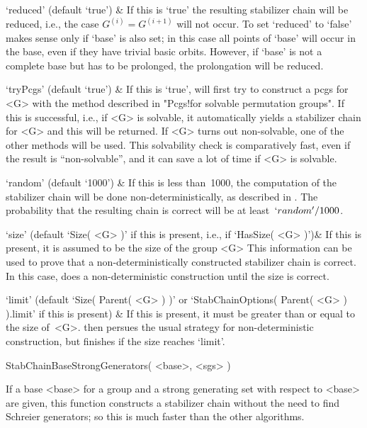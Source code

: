 `reduced' (default `true') &
        If this  is `true' the  resulting
        stabilizer chain   will  be reduced, i.e.,   the case  $G^{(i)} =
        G^{(i+1)}$  will  not occur. To set   `reduced'  to `false' makes
        sense only  if  `base' is also  set;  in this case  all points of
        `base' will occur  in the base,  even if they have  trivial basic
        orbits. However, if `base' is  not a complete base  but has to be
        prolonged, the prolongation will be reduced.

`tryPcgs' (default `true') &
        If this is `true', {\GAP} will first try to  construct a pcgs for
        <G> with  the method described  in "Pcgs!for solvable permutation
        groups".  If this is  successful, i.e.,  if  <G> is  solvable, it
        automatically yields a stabilizer chain for <G>  and this will be
        returned. If <G> turns out non-solvable, one of the other methods
        will be used. This solvability  check is comparatively fast, even
        if the result is ``non-solvable'', and it  can save a lot of time
        if <G> is solvable.

`random' (default `1000') &
        If this  is  less than~1000,  the  computation of the  stabilizer
        chain  will  be   done  non-deterministically, as  described   in
        \cite{Seress97}. The  probability  that the  resulting  chain  is
        correct will be at least~$`random'/1000$.

`size' (default `Size( <G> )' if this is present, i.e., if `HasSize( <G>
)')&
        If this is present, it is assumed to be the size of the group <G>
        This      information    can  be    used    to   prove    that  a
        non-deterministically constructed stabilizer chain is correct. In
        this case, {\GAP} does a non-deterministic construction until the
        size is correct.

`limit' (default `Size( Parent( <G> ) )' or `StabChainOptions( Parent(
<G> ) ).limit' if this is present) &
        If this is present, it must be greater than or  equal to the size
        of~<G>.   {\GAP}   then    persues   the   usual   strategy   for
        non-deterministic construction,  but finishes if the size reaches
        `limit'.
\enditems

\>StabChainBaseStrongGenerators( <base>, <sgs> )

If a base <base> for a group and a strong generating  set with respect to
<base> are given, this function constructs a stabilizer chain without the
need to find Schreier  generators; so this  is much faster than the other
algorithms.

